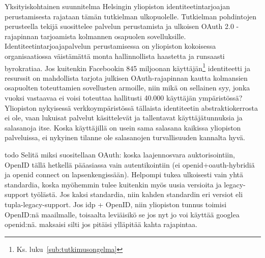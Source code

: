 \documentclass[finnish,gradu]{tktltiki}
\begin{document}
  Yksityiskohtainen suunnitelma Helsingin yliopiston identiteetintarjoajan perustamisesta rajataan tämän tutkielman ulkopuolelle. Tutkielman pohdintojen perusteella tekijä suosittelee palvelun perustamista ja ulkoisen OAuth 2.0 -rajapinnan tarjoamista kolmannen osapuolen sovelluksille. Identiteetintarjoajapalvelun perustamisessa on yliopiston kokoisessa organisaatiossa väistämättä monta hallinnollista haastetta ja runsaasti byrokratiaa. Jos kuitenkin Facebookin 845 miljoonan käyttäjän\footnote{Ks. luku~\ref{sub:tutkimusongelma}} identiteetti ja resurssit on mahdollista tarjota julkisen OAuth-rajapinnan kautta kolmansien osapuolten toteuttamien sovellusten armoille, niin mikä on sellainen syy, jonka vuoksi vastaavaa ei voisi toteuttaa hallitusti 40.000 käyttäjän ympäristössä? Yliopiston nykyisessä verkkoympäristössä tällaista identiteetin abstraktiokerrosta ei ole, vaan lukuisat palvelut käsittelevät ja tallentavat käyttäjätunnuksia ja salasanoja itse. Koska käyttäjillä on usein sama salasana kaikissa yliopiston palveluissa, ei nykyinen tilanne ole salasanojen turvallisuuden kannalta hyvä.

  todo Selitä miksi suositellaan OAuth: koska laajennosvara auktorisointiin, OpenID tällä hetkellä pääasiassa vain autentikointiin (ei openid+oauth-hybridiä ja openid connect on lapsenkengissään). Helpompi tukea ulkoisesti vain yhtä standardia, koska myöhemmin tulee kuitenkin myös uusia versioita ja legacy-support työlästä. Jos kaksi standardia, niin kahden standardin eri versiot eli tupla-legacy-support. Jos idp + OpenID, niin yliopiston tunnus toimisi OpenID:nä maailmalle, toisaalta leviäisikö se jos nyt jo voi käyttää googlea openid:nä. maksaisi silti jos pitäisi ylläpitää kahta rajapintaa.

\end{document}
